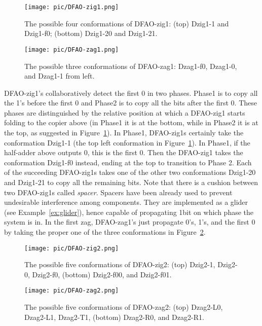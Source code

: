 \begin{figure}[h]
\texttt{[image: pic/DFAO-zig1.png]}  
  \caption{The possible four conformations of DFAO-zig1: (top) Dzig1-1 and Dzig1-f0; (bottom) Dzig1-20 and Dzig1-21.}
  \label{fig:DFAO-zig1}
\end{figure} 


\begin{figure}[h]
  \texttt{[image: pic/DFAO-zag1.png]}
  \caption{The possible three conformations of DFAO-zag1: Dzag1-f0, Dzag1-0, and Dzag1-1 from left.}
  \label{fig:DFAO-zag1}
\end{figure} 

DFAO-zig1's collaboratively detect the first 0 in two phases.
Phase1 is to copy all the 1's before the first 0 and Phase2 is to copy all the bits after the first 0.
These phases are distinguished by the relative position at which a DFAO-zig1 starts folding to the copier above (in Phase1 it is at the bottom, while in Phase2 it is at the top, as suggested in Figure~\ref{fig:DFAO-zig1}).
In Phase1, DFAO-zig1s certainly take the conformation Dzig1-1 (the top left conformation in Figure~\ref{fig:DFAO-zig1}).
In Phase1, if the half-adder above outputs 0, this is the first 0. 
Then the DFAO-zig1 takes the conformation Dzig1-f0 instead, ending at the top to transition to Phase 2.
Each of the succeeding DFAO-zig1s takes one of the other two conformations Dzig1-20 and Dzig1-21 to copy all the remaining bits. 
Note that there is a cushion between two DFAO-zig1s called \textit{spacer}.
Spacers have been already used to prevent undesirable interference among components.
They are implemented as a glider (see Example~\ref{ex:glider}), hence capable of propagating 1bit on which phase the system is in.
In the first zag, DFAO-zag1's just propagate 0's, 1's, and the first 0 by taking the proper one of the three conformations in Figure~\ref{fig:DFAO-zag1}.

\begin{figure}[h]
\texttt{[image: pic/DFAO-zig2.png]}
  \caption{The possible five conformations of DFAO-zig2: (top) Dzig2-1, Dzig2-0, Dzig2-f0, (bottom) Dzig2-f00, and Dzig2-f01. }
  \label{fig:DFAO-zig2}
\end{figure} 

\begin{figure}[h]
\texttt{[image: pic/DFAO-zag2.png]}
  \caption{The possible five conformations of DFAO-zag2: (top) Dzag2-L0, Dzag2-L1, Dzag2-T1, (bottom) Dzag2-R0, and Dzag2-R1.}
  \label{fig:DFAO-zag2}
  \end{figure} 

